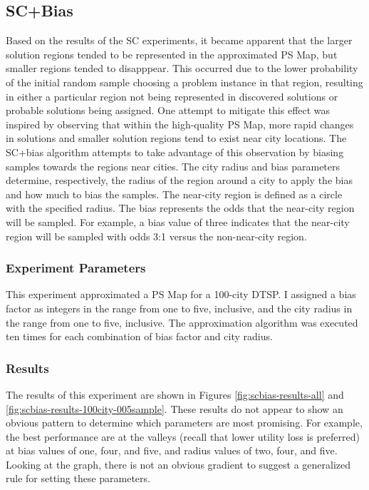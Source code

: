 \subsection{SC+Bias} 

Based on the results of the SC experiments, it became apparent that the larger solution regions tended to be represented in the approximated PS Map, but smaller regions tended to disapppear.  This occurred due to the lower probability of the initial random sample choosing a problem instance in that region, resulting in either a particular region not being represented in discovered solutions or probable solutions being assigned.  One attempt to mitigate this effect was inspired by observing that within the high-quality PS Map, more rapid changes in solutions and smaller solution regions tend to exist near city locations.  The SC+bias algorithm attempts to take advantage of this observation by biasing samples towards the regions near cities.  The city radius and bias parameters determine, respectively, the radius of the region around a city to apply the bias and how much to bias the samples.  The near-city region is defined as a circle with the specified radius.  The bias represents the odds that the near-city region will be sampled.  For example, a bias value of three indicates that the near-city region will be sampled with odds 3:1 versus the non-near-city region.  

\subsubsection{Experiment Parameters} This experiment approximated a PS Map for a 100-city DTSP.  I assigned a bias factor as integers in the range from one to five, inclusive, and the city radius in the range from one to five, inclusive. The approximation algorithm was executed ten times for each combination of bias factor and city radius.

\subsubsection{Results} The results of this experiment are shown in Figures \ref{fig:scbias-results-all} and \ref{fig:scbias-results-100city-005sample}.  These results do not appear to show an obvious pattern to determine which parameters are most promising.  For example, the best performance are at the valleys (recall that lower utility loss is preferred)  at bias values of one, four, and five, and radius values of two, four, and five.  Looking at the graph, there is not an obvious gradient to suggest a generalized rule for setting these parameters.




